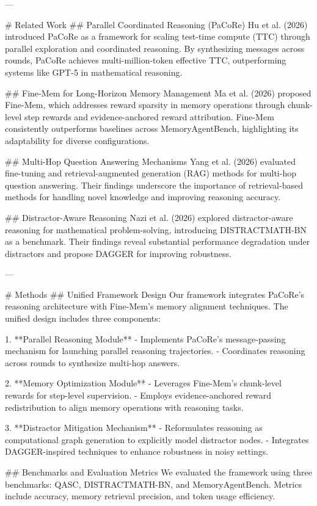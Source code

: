 ---

# Related Work  
## Parallel Coordinated Reasoning (PaCoRe)  
Hu et al. (2026) introduced PaCoRe as a framework for scaling test-time compute (TTC) through parallel exploration and coordinated reasoning. By synthesizing messages across rounds, PaCoRe achieves multi-million-token effective TTC, outperforming systems like GPT-5 in mathematical reasoning.  

## Fine-Mem for Long-Horizon Memory Management  
Ma et al. (2026) proposed Fine-Mem, which addresses reward sparsity in memory operations through chunk-level step rewards and evidence-anchored reward attribution. Fine-Mem consistently outperforms baselines across MemoryAgentBench, highlighting its adaptability for diverse configurations.

## Multi-Hop Question Answering Mechanisms  
Yang et al. (2026) evaluated fine-tuning and retrieval-augmented generation (RAG) methods for multi-hop question answering. Their findings underscore the importance of retrieval-based methods for handling novel knowledge and improving reasoning accuracy.

## Distractor-Aware Reasoning  
Nazi et al. (2026) explored distractor-aware reasoning for mathematical problem-solving, introducing DISTRACTMATH-BN as a benchmark. Their findings reveal substantial performance degradation under distractors and propose DAGGER for improving robustness.

---

# Methods  
## Unified Framework Design  
Our framework integrates PaCoRe's reasoning architecture with Fine-Mem's memory alignment techniques. The unified design includes three components:  

1. **Parallel Reasoning Module**  
   - Implements PaCoRe's message-passing mechanism for launching parallel reasoning trajectories.  
   - Coordinates reasoning across rounds to synthesize multi-hop answers.  

2. **Memory Optimization Module**  
   - Leverages Fine-Mem's chunk-level rewards for step-level supervision.  
   - Employs evidence-anchored reward redistribution to align memory operations with reasoning tasks.  

3. **Distractor Mitigation Mechanism**  
   - Reformulates reasoning as computational graph generation to explicitly model distractor nodes.  
   - Integrates DAGGER-inspired techniques to enhance robustness in noisy settings.  

## Benchmarks and Evaluation Metrics  
We evaluated the framework using three benchmarks: QASC, DISTRACTMATH-BN, and MemoryAgentBench. Metrics include accuracy, memory retrieval precision, and token usage efficiency.  

